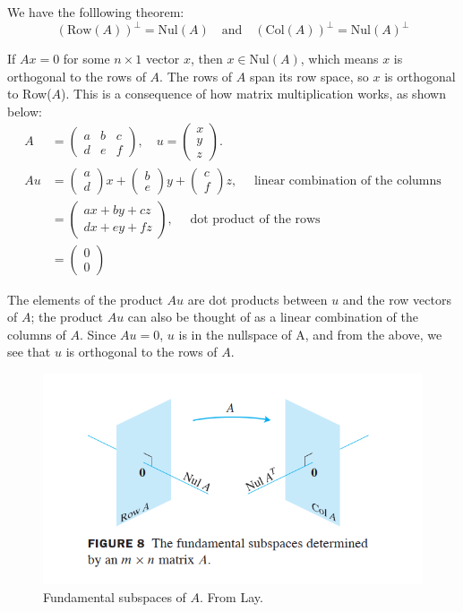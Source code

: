 \documentclass[]{article}
\begin{document}
We have the folllowing theorem: 
\begin{equation}
(\textrm{Row}(A))^\bot = \textrm{Nul}(A) \quad \textrm{and} \quad (\textrm{Col}(A))^\bot = \textrm{Nul}(A)^\bot 
\end{equation}

If $Ax = 0$ for some $n \times 1$ vector $x$, then $x \in \textrm{Nul}(A)$, which means $x$ is orthogonal to the rows of $A$. The rows of $A$ span its row space, so $x$ is orthogonal to Row($A$). This is a consequence of how matrix multiplication works, as shown below: 
\begin{align}
	A &= \begin{pmatrix} a & b & c \\ d & e & f \end{pmatrix}, \quad u = \begin{pmatrix} x \\ y \\ z \end{pmatrix}. \\
	Au &= \begin{pmatrix}	a \\ d	\end{pmatrix} x + \begin{pmatrix}	b \\ e	\end{pmatrix} y + \begin{pmatrix}	c \\ f	\end{pmatrix} z, \quad \textrm{ linear combination of the columns}\\
		&= \begin{pmatrix} ax + by + cz \\ dx + ey + fz \end{pmatrix}, \quad \textrm{ dot product of the rows}\\
		&= \begin{pmatrix} 0 \\ 0 \end{pmatrix} 
\end{align}

The elements of the product $Au$ are dot products between $u$ and the row vectors of $A$; the product $Au$ can also be thought of as a linear combination of the columns of $A$. Since $Au = 0$, $u$ is in the nullspace of A, and from the above, we see that $u$ is orthogonal to the rows of $A$.

\begin{figure}[H]
	\centering
	\includegraphics[width=0.7\linewidth]{figs/Lay_fundamental_subspaces}
	\caption{Fundamental subspaces of $A$. From Lay.}
	\label{fig:layfundamentalsubspaces}
\end{figure}
\end{document}
